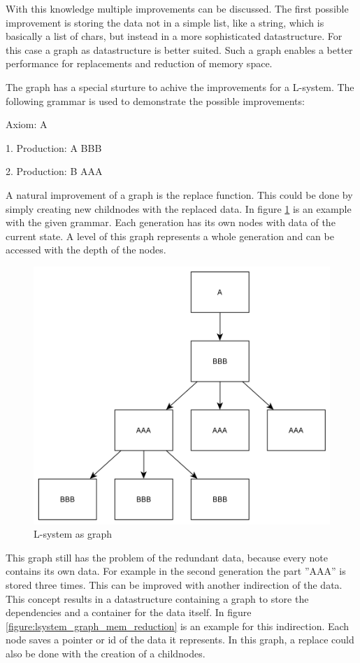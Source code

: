 \documentclass[english]{cpp-hmwk}
\begin{document}
\medskip
\noindent With this knowledge multiple improvements can be discussed. The first possible improvement is storing the data not in a simple list, like a string, which is basically a list of chars, but instead in a more sophisticated datastructure. For this case a graph as datastructure is better suited. Such a graph enables a better performance for replacements and reduction of memory space.

\medskip
\noindent The graph has a special sturture to achive the improvements for a L-system. The following grammar is used to demonstrate the possible improvements:
 
Axiom: A

1. Production: A \rightarrow BBB

2. Production: B \rightarrow AAA

\medskip

\noindent A natural improvement of a graph is the replace function. This could be done by simply creating new childnodes with the replaced data. In figure \ref{figure:lsystem_graph} is an example with the given grammar. Each generation has its own nodes with data of the current state. A level of this graph represents a whole generation and can be accessed with the depth of the nodes.

\begin{figure}[h!]
	\centering
	\includegraphics[width=0.6\columnwidth]{../graphs/LSystem/examples/lsystem_graph_example.png}
	\caption{L-system as graph}
	\label{figure:lsystem_graph}
\end{figure}

\medskip

\noindent This graph still has the problem of the redundant data, because every note contains its own data. For example in the second generation the part ''AAA'' is stored three times. This can be improved with another indirection of the data. This concept results in a datastructure containing a graph to store the dependencies and a container for the data itself. In figure \ref{figure:lsystem_graph_mem_reduction} is an example for this indirection. Each node saves a pointer or id of the data it represents. In this graph, a replace could also be done with the creation of a childnodes.
\end{document}
